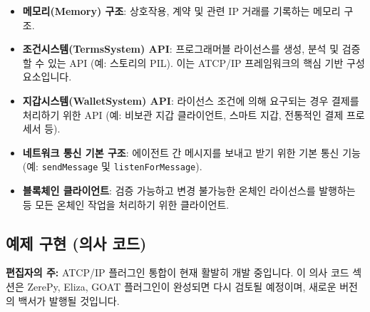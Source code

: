 \documentclass[journal,onecolumn]{IEEEtran} %
\begin{document}
\begin{itemize}
    \item \textbf{메모리(Memory) 구조}: 상호작용, 계약 및 관련 IP 거래를 기록하는 메모리 구조.
    \item \textbf{조건시스템(TermsSystem) API}: 프로그래머블 라이선스를 생성, 분석 및 검증할 수 있는 API (예: 스토리의 PIL\cite{ref6}). 이는 ATCP/IP 프레임워크의 핵심 기반 구성 요소입니다.
    \item \textbf{지갑시스템(WalletSystem) API}: 라이선스 조건에 의해 요구되는 경우 결제를 처리하기 위한 API (예: 비보관 지갑 클라이언트, 스마트 지갑, 전통적인 결제 프로세서 등).
    \item \textbf{네트워크 통신 기본 구조}: 에이전트 간 메시지를 보내고 받기 위한 기본 통신 기능 (예: \texttt{sendMessage} 및 \texttt{listenForMessage}).
    \item \textbf{블록체인 클라이언트}: 검증 가능하고 변경 불가능한 온체인 라이선스를 발행하는 등 모든 온체인 작업을 처리하기 위한 클라이언트.
\end{itemize}

\subsection{예제 구현 (의사 코드)}

\textbf{편집자의 주:}  
ATCP/IP 플러그인 통합이 현재 활발히 개발 중입니다. 이 의사 코드 섹션은 ZerePy, Eliza, GOAT 플러그인이 완성되면 다시 검토될 예정이며, 새로운 버전의 백서가 발행될 것입니다.


\end{document}
